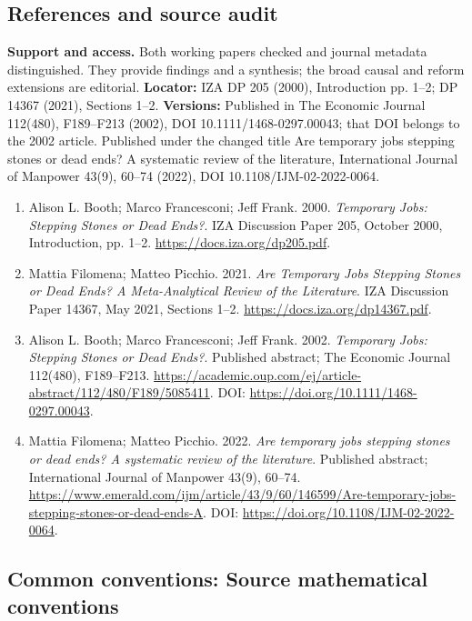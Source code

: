 \documentclass[11pt,a4paper]{article}
\begin{document}
\subsection*{References and source audit}
\textbf{Support and access.} Both working papers checked and journal metadata distinguished. They provide findings and a synthesis; the broad causal and reform extensions are editorial. \textbf{Locator:} IZA DP 205 (2000), Introduction pp. 1--2; DP 14367 (2021), Sections 1--2. \textbf{Versions:} Published in The Economic Journal 112(480), F189--F213 (2002), DOI 10.1111/1468-0297.00043; that DOI belongs to the 2002 article. Published under the changed title Are temporary jobs stepping stones or dead ends? A systematic review of the literature, International Journal of Manpower 43(9), 60--74 (2022), DOI 10.1108/IJM-02-2022-0064.  
\begin{enumerate}\raggedright
\item\hypertarget{definitions:source:30007641:1}{} Alison L. Booth; Marco Francesconi; Jeff Frank. 2000. \emph{Temporary Jobs: Stepping Stones or Dead Ends?}. IZA Discussion Paper 205, October 2000, Introduction, pp. 1--2.
\url{https://docs.iza.org/dp205.pdf}.
\item\hypertarget{definitions:source:30007641:2}{} Mattia Filomena; Matteo Picchio. 2021. \emph{Are Temporary Jobs Stepping Stones or Dead Ends? A Meta-Analytical Review of the Literature}. IZA Discussion Paper 14367, May 2021, Sections 1--2.
\url{https://docs.iza.org/dp14367.pdf}.
\item\hypertarget{definitions:source:30007641:3}{} Alison L. Booth; Marco Francesconi; Jeff Frank. 2002. \emph{Temporary Jobs: Stepping Stones or Dead Ends?}. Published abstract; The Economic Journal 112(480), F189--F213.
\url{https://academic.oup.com/ej/article-abstract/112/480/F189/5085411}.
DOI: \url{https://doi.org/10.1111/1468-0297.00043}.
\item\hypertarget{definitions:source:30007641:4}{} Mattia Filomena; Matteo Picchio. 2022. \emph{Are temporary jobs stepping stones or dead ends? A systematic review of the literature}. Published abstract; International Journal of Manpower 43(9), 60--74.
\url{https://www.emerald.com/ijm/article/43/9/60/146599/Are-temporary-jobs-stepping-stones-or-dead-ends-A}.
DOI: \url{https://doi.org/10.1108/IJM-02-2022-0064}.
\end{enumerate}

\subsection*{Common conventions: Source mathematical conventions}
\end{document}

